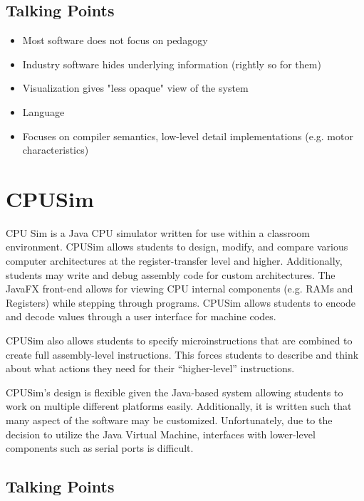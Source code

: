\subsection{Talking Points}

\begin{itemize}
\item Most software does not focus on pedagogy
\item Industry software hides underlying information (rightly so for them)
\item Visualization gives "less opaque" view of the system
\item Language 
\item Focuses on compiler semantics, low-level detail implementations (e.g. motor characteristics)
\end{itemize}

\section{CPUSim}

\cite{Skrien2001}

CPU Sim is a Java CPU simulator written for use within a classroom environment. CPUSim allows students to design, modify, and compare various computer architectures at the register-transfer level and higher. Additionally, students may write and debug assembly code for custom architectures. The JavaFX front-end allows for viewing CPU internal components (e.g. RAMs and Registers) while stepping through programs. CPUSim allows students to encode and decode values through a user interface for machine codes. 

CPUSim also allows students to specify microinstructions that are combined to create full assembly-level instructions. This forces students to describe and think about what actions they need for their ``higher-level'' instructions. 

CPUSim's design is flexible given the Java-based system allowing students to work on multiple different platforms easily. Additionally, it is written such that many aspect of the software may be customized. Unfortunately, due to the decision to utilize the Java Virtual Machine, interfaces with lower-level components such as serial ports is difficult. 

\subsection{Talking Points}

